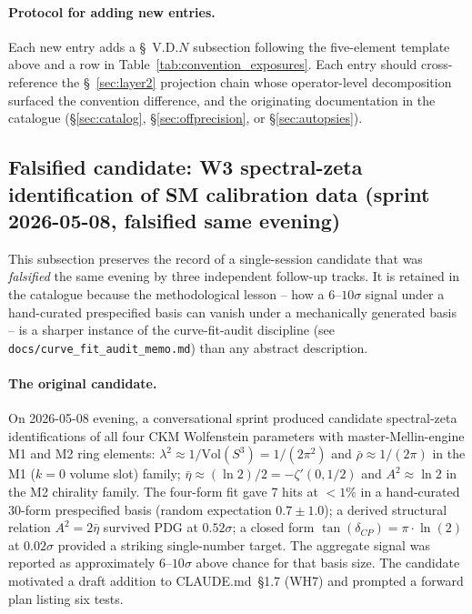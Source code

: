 \documentclass[11pt]{article}
\begin{document}
\paragraph{Protocol for adding new entries.}
Each new entry adds a \S~V.D.$N$ subsection following the five-element
template above and a row in Table~\ref{tab:convention_exposures}.
Each entry should cross-reference the \S~\ref{sec:layer2} projection
chain whose operator-level decomposition surfaced the convention
difference, and the originating documentation in the catalogue
(\S\ref{sec:catalog}, \S\ref{sec:offprecision}, or \S\ref{sec:autopsies}).

\subsection{Falsified candidate: W3 spectral-zeta identification of
SM calibration data (sprint 2026-05-08, falsified same evening)}
\label{sec:calibration_candidates}

This subsection preserves the record of a single-session candidate
that was \emph{falsified} the same evening by three independent
follow-up tracks.  It is retained in the catalogue because the
methodological lesson -- how a $6$--$10\sigma$ signal under a
hand-curated prespecified basis can vanish under a mechanically
generated basis -- is a sharper instance of the curve-fit-audit
discipline (see \texttt{docs/curve\_fit\_audit\_memo.md}) than any
abstract description.

\paragraph{The original candidate.}
On 2026-05-08 evening, a conversational sprint produced candidate
spectral-zeta identifications of all four CKM Wolfenstein parameters
with master-Mellin-engine M1 and M2 ring elements:
$\lambda^2 \approx 1/\mathrm{Vol}(S^3) = 1/(2\pi^2)$ and
$\bar\rho \approx 1/(2\pi)$ in the M1 ($k = 0$ volume slot) family;
$\bar\eta \approx (\ln 2)/2 = -\zeta'(0,1/2)$ and
$A^2 \approx \ln 2$ in the M2 chirality family.  The four-form fit
gave 7 hits at $<1\%$ in a hand-curated 30-form prespecified basis
(random expectation $0.7\pm 1.0$); a derived structural relation
$A^2 = 2\bar\eta$ survived PDG at $0.52\sigma$; a closed form
$\tan(\delta_{CP}) = \pi\cdot\ln(2)$ at $0.02\sigma$ provided a
striking single-number target.  The aggregate signal was reported as
approximately $6$--$10\sigma$ above chance for that basis size.  The
candidate motivated a draft addition to CLAUDE.md~\S 1.7 (WH7) and
prompted a forward plan listing six tests.
\end{document}

